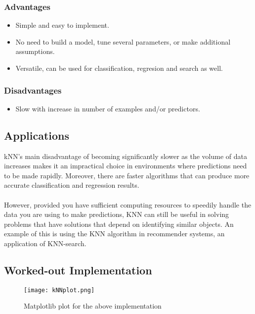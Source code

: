     \subsubsection*{Advantages}
    \begin{itemize}
        \item Simple and easy to implement.
        \item No need to build a model, tune several parameters, or make additional assumptions.
        \item Versatile, can be used for classification, regresion and search as well.
    \end{itemize}

    \subsubsection*{Disadvantages}
    \begin{itemize}
        \item Slow with increase in number of examples and/or predictors.
    \end{itemize}
    
\subsection*{Applications}
    kNN’s main disadvantage of becoming significantly slower as the volume of data increases makes it an impractical choice in environments where predictions need to be made rapidly. Moreover, there are faster algorithms that can produce more accurate classification and regression results.\\ \\
    However, provided you have sufficient computing resources to speedily handle the data you are using to make predictions, KNN can still be useful in solving problems that have solutions that depend on identifying similar objects. An example of this is using the KNN algorithm in recommender systems, an application of KNN-search.

\subsection*{Worked-out Implementation}


\begin{figure}[h]
    \centering
    \texttt{[image: kNNplot.png]}
    \caption{Matplotlib plot for the above implementation}
\end{figure}